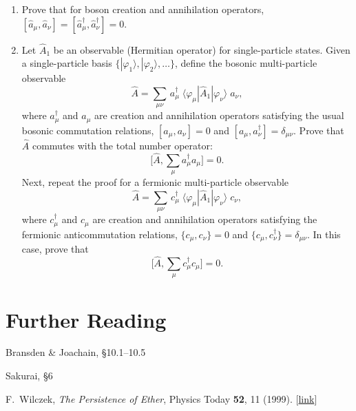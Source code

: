 \documentclass[pra,12pt]{revtex4}
\begin{document}
\begin{enumerate}
\item
  Prove that for boson creation and annihilation operators, $[\hat{a}_\mu,\hat{a}_\nu] = [\hat{a}_\mu^\dagger,\hat{a}_\nu^\dagger] = 0$.
  \label{ex:boson_commutators}

\item
  Let $\hat{A}_1$ be an observable (Hermitian operator) for
  single-particle states.  Given a single-particle basis
  $\{|\varphi_1\rangle,|\varphi_2\rangle,\dots\}$, define the
  bosonic multi-particle observable
  \begin{equation}
    \hat{A} = \sum_{\mu\nu} \,a^\dagger_\mu \; \langle\varphi_\mu|\hat{A}_1|\varphi_\nu\rangle \; a_\nu,
  \end{equation}
  where $a_\mu^\dagger$ and $a_\mu$ are creation and annihilation
  operators satisfying the usual bosonic commutation relations,
  $[a_\mu,a_\nu] = 0$ and $[a_\mu,a_\nu^\dagger] = \delta_{\mu\nu}$.
  Prove that $\hat{A}$ commutes with the total number operator:
  \begin{equation}
    \Big[\hat{A}, \sum_\mu a^\dagger_\mu a_\mu \Big] = 0.
  \end{equation}
  Next, repeat the proof for a fermionic multi-particle observable
  \begin{equation}
    \hat{A} = \sum_{\mu\nu} \,c^\dagger_\mu \; \langle\varphi_\mu|\hat{A}_1|\varphi_\nu\rangle \; c_\nu,
  \end{equation}
  where $c_\mu^\dagger$ and $c_\mu$ are creation and annihilation
  operators satisfying the fermionic anticommutation relations,
  $\{c_\mu,c_\nu\} = 0$ and $\{c_\mu,c_\nu^\dagger\} = \delta_{\mu\nu}$.
  In this case, prove that
  \begin{equation}
    \Big[\hat{A}, \sum_\mu c^\dagger_\mu c_\mu \Big] = 0.
  \end{equation}
  \label{ex:n_conserved}

\end{enumerate}

\section*{Further Reading}

\begin{enumerate}[[1{]}]
\item Bransden \& Joachain, \S10.1--10.5

\item Sakurai, \S6

\item F.~Wilczek, \textit{The Persistence of Ether}, Physics Today
  \textbf{52}, 11 (1999). [\href{http://physicstoday.scitation.org/doi/10.1063/1.882562}{link}]
\label{cite:wilczek}
\end{enumerate}
\end{document}
